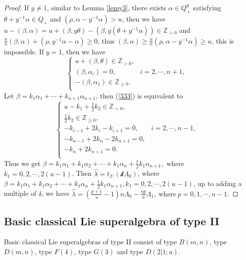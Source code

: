 \documentclass[12pt]{article}
\begin{document}
\begin{proof}
If $y\ne 1$, similar to Lemma \ref{lemy3}, there exists $\alpha\in Q_{+}^0$ satisfying $\theta+y^{-1}\alpha\in Q_+$ and $(\rho,\alpha-y^{-1}\alpha)> n$,
then we have $u-(\beta,\alpha)=u+(\beta,y\theta)-(\beta,y(\theta+y^{-1}\alpha))\in\mathbb{Z}_{>0}$ and $\frac{n}{u}(\beta,\alpha)+(\rho,y^{-1}\alpha-\alpha)\geq0$,
thus $(\beta,\alpha)\geq\frac{u}{n}(\rho,\alpha-y^{-1}\alpha)\geq u$,
this is impossible.
If $y=1$, then we have
\begin{equation}\label{333}
\begin{cases}
  u+(\beta,\theta)\in\mathbb{Z}_{>0},&\\
  (\beta,\alpha_i)=0, &i=2,\cdots,n+1,\\
  -(\beta,\alpha_1)\in\mathbb{Z}_{\geq0}.\\
\end{cases}
\end{equation}
Let $\beta=k_1\alpha_1+\cdots+k_{n+1}\alpha_{n+1}$,
then (\ref{333}) is equivalent to
$$\begin{cases}
  u-k_1+\frac{1}{2}k_2\in\mathbb{Z}_{>0},\\
  \frac{1}{2}k_2\in\mathbb{Z}_{\geq0},\\
  -k_{i-1}+2k_i-k_{i+1}=0, &i=2,\cdots,n-1,\\
   -k_{n-1}+2k_n-2k_{n+1}=0,\\
  -k_n+2k_{n+1}=0.\\
\end{cases}$$
Thus we get $\beta=k_1\alpha_1+k_1\alpha_2+\cdots+k_1\alpha_n+\frac{1}{2}k_1\alpha_{n+1},$ where $k_1=0,2,\cdots,2(u-1)$.
Then $\hat{\lambda}=t_\beta.(\mathcal{k}\Lambda_0)$, where $\beta=k_1\alpha_1+k_1\alpha_2+\cdots+k_1\alpha_n+\frac{1}{2}k_1\alpha_{n+1}, k_1=0,2,\cdots,2(u-1)$,
up to adding a multiple of $\delta$,
we have $\hat{\lambda}=(\frac{p+1}{u}-1)n\Lambda_0-\frac{np}{u}\Lambda_1,~\mbox{where}~p=0,1,\cdots,u-1.$
\end{proof}
\subsection{Basic classical Lie superalgebra of type II}
Basic classical Lie superalgebras of type II consist of type $B(m,n)$, type $D(m,n)$, type $F(4)$, type $G(3)$ and type $D(2|1;a)$.
\end{document}
